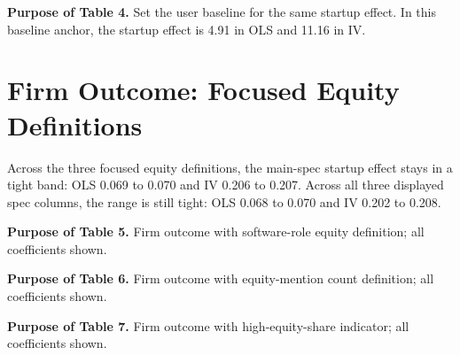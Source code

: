 \documentclass{article}
\newcommand{\cleanedresultsdir}{../results/cleaned/tex}
\newcommand{\TableInput}[2][\linewidth]{}
\begin{document}
\begin{table}[H]
  \centering
  \caption{Firm outcome baseline}
  \TableInput{\cleanedresultsdir/llm_equity_pi_followups_anchor_firm_core.tex}
\end{table}

\noindent\textbf{Purpose of Table 4.} Set the user baseline for the same startup effect.
In this baseline anchor, the startup effect is 4.91 in OLS and 11.16 in IV.

\begin{table}[H]
  \centering
  \caption{User outcome baseline}
  \TableInput{\cleanedresultsdir/llm_equity_pi_followups_anchor_user_core.tex}
\end{table}

\section*{Firm Outcome: Focused Equity Definitions}
Across the three focused equity definitions, the main-spec startup effect stays in a tight band:
OLS 0.069 to 0.070 and IV 0.206 to 0.207.
Across all three displayed spec columns, the range is still tight:
OLS 0.068 to 0.070 and IV 0.202 to 0.208.

\noindent\textbf{Purpose of Table 5.} Firm outcome with software-role equity definition; all coefficients shown.

\begin{table}[H]
  \centering
  \caption{Firm outcome: any equity mention (software roles only), full specification set}
  \TableInput{\cleanedresultsdir/llm_equity_pi_followups_firm_measure_software.tex}
\end{table}

\noindent\textbf{Purpose of Table 6.} Firm outcome with equity-mention count definition; all coefficients shown.

\begin{table}[H]
  \centering
  \caption{Firm outcome: average number of equity mentions, full specification set}
  \TableInput{\cleanedresultsdir/llm_equity_pi_followups_firm_measure_count.tex}
\end{table}

\noindent\textbf{Purpose of Table 7.} Firm outcome with high-equity-share indicator; all coefficients shown.

\begin{table}[H]
  \centering
  \caption{Firm outcome: high equity-share indicator (top quartile), full specification set}
  \TableInput{\cleanedresultsdir/llm_equity_pi_followups_firm_measure_topq.tex}
\end{table}
\end{document}
